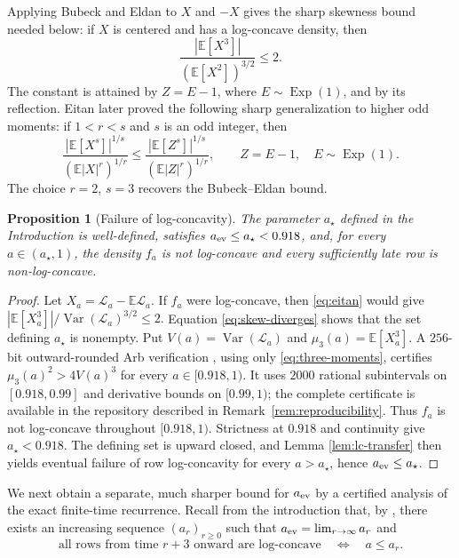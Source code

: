 \documentclass[11pt]{article}
\numberwithin{equation}{section}
\newtheorem{proposition}[theorem]{Proposition}
\theoremstyle{remark}
\newcommand{\E}{\mathbb{E}}
\begin{document}
Applying Bubeck and Eldan \cite[Lemma 2]{bubeck-eldan} to $X$ and $-X$
gives the sharp skewness bound needed below: if $X$ is centered and has a log-concave density,
then
\begin{equation}\label{eq:eitan}
 \frac{|\E[X^3]|}{(\E[X^2])^{3/2}}\leq2.
\end{equation}
The constant is attained by $Z=E-1$, where $E\sim\operatorname{Exp}(1)$, and
by its reflection. Eitan \cite[Theorem 5]{eitan} later proved the following
sharp generalization to higher odd moments: if $1<r<s$ and $s$ is an odd
integer, then
\begin{equation}\label{eq:eitan-general}
 \frac{|\E[X^s]|^{1/s}}{(\E|X|^r)^{1/r}}
 \leq
 \frac{|\E[Z^s]|^{1/s}}{(\E|Z|^r)^{1/r}},
 \qquad Z=E-1,\quad E\sim\operatorname{Exp}(1).
\end{equation}
The choice $r=2$, $s=3$ recovers the Bubeck--Eldan bound.

\begin{proposition}[Failure of log-concavity]\label{thm:failure-near-one}
The parameter $a_\star$ defined in the Introduction is well-defined, satisfies
$a_{\rm ev}\leq a_\star<0.918$, and, for every $a\in(a_\star,1)$, the density
$f_a$ is not log-concave and every sufficiently late row is non-log-concave.
\end{proposition}

\begin{proof}
Let $X_a=\mathcal{L}_a-\E \mathcal{L}_a$. If $f_a$ were log-concave, then
\eqref{eq:eitan} would give
$|\E[X_a^3]|/\operatorname{Var}(\mathcal{L}_a)^{3/2} \leq2.$
Equation \eqref{eq:skew-diverges} shows that the set defining $a_\star$ is
nonempty. Put $V(a)=\operatorname{Var}(\mathcal{L}_a)$ and
$\mu_3(a)=\E[X_a^3]$. A $256$-bit outward-rounded Arb verification
\cite{johansson-arb}, using only \eqref{eq:three-moments}, certifies
$\mu_3(a)^2>4V(a)^3$ for every $a\in[0.918,1)$. It uses $2000$ rational
subintervals on $[0.918,0.99]$ and derivative bounds on $[0.99,1)$; the complete
certificate is available in the repository described in
Remark~\ref{rem:reproducibility}. Thus $f_a$ is not log-concave
throughout $[0.918,1)$. Strictness at $0.918$ and continuity give
$a_\star<0.918$. The defining set is upward closed, and Lemma
\ref{lem:lc-transfer} then yields eventual failure of row log-concavity for every
$a>a_\star$, hence $a_{\rm ev}\leq a_\star$.
\end{proof}

We next obtain a separate, much sharper bound for $a_{\rm ev}$ by a certified
analysis of the exact finite-time recurrence. Recall from the introduction that, by
\cite[Remark 2.3]{guerin-laulin-raschel-simon}, there exists an increasing sequence $(a_r)_{r\geq0}$ such that $a_{\rm ev}=\lim_{r\to\infty}a_r$ and
\begin{equation}\label{eq:threshold-structure}
 \text{all rows from time $r+3$ onward are log-concave}
 \quad\Longleftrightarrow\quad a\leq a_r.
\end{equation}
\end{document}
